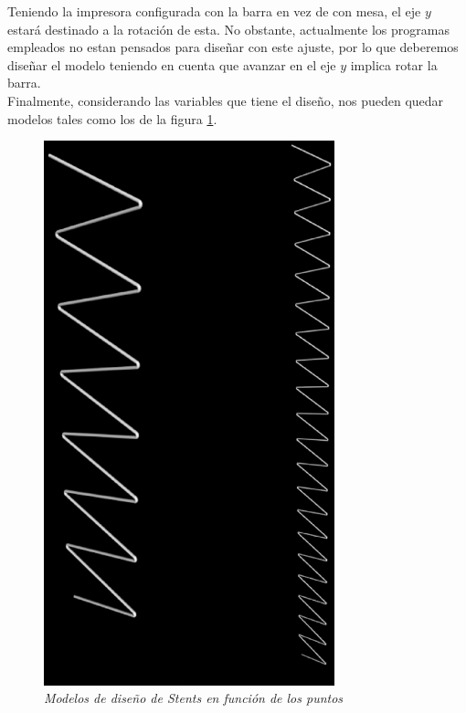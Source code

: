 \documentclass[a4paper,12pt]{article}
\begin{document}
Teniendo la impresora configurada con la barra en vez de con mesa, el eje $y$ estará destinado a la rotación de esta. No obstante, actualmente los programas empleados no estan pensados para diseñar con este ajuste, por lo que deberemos diseñar el modelo teniendo en cuenta que avanzar en el eje $y$ implica rotar la barra.\\

Finalmente, considerando las variables que tiene el diseño, nos pueden quedar modelos tales como los de la figura \ref{fig:modeloStents}.

	\begin{figure}[!ht]
	\begin{center}
	  \includegraphics[width=0.75\textwidth]{Figuras/modeloStents.eps}
	  \caption{\emph{Modelos de diseño de Stents en función de los puntos}}
	\end{center}
	\label{fig:modeloStents}
	\end{figure}
\end{document}
